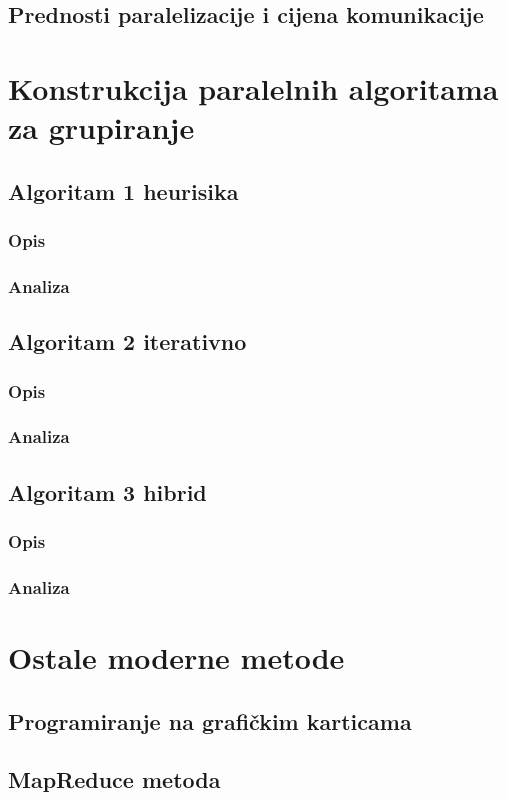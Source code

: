 \documentclass[a4paper,twoside,12pt]{memoir} %
\begin{document}
\section[Prednosti paralelizacije i cijena komunikacije][pred-man-paralel]{Prednosti paralelizacije i cijena komunikacije}
\chapter{Konstrukcija paralelnih algoritama za grupiranje}
\section{Algoritam 1 heurisika}
\subsection{Opis}
\subsection{Analiza}
\section{Algoritam 2 iterativno}
\subsection{Opis}
\subsection{Analiza}
\section{Algoritam 3 hibrid}
\subsection{Opis}
\subsection{Analiza}
\chapter{Ostale moderne metode}
\section{Programiranje na grafičkim karticama}
\section{MapReduce metoda}
\end{document}
